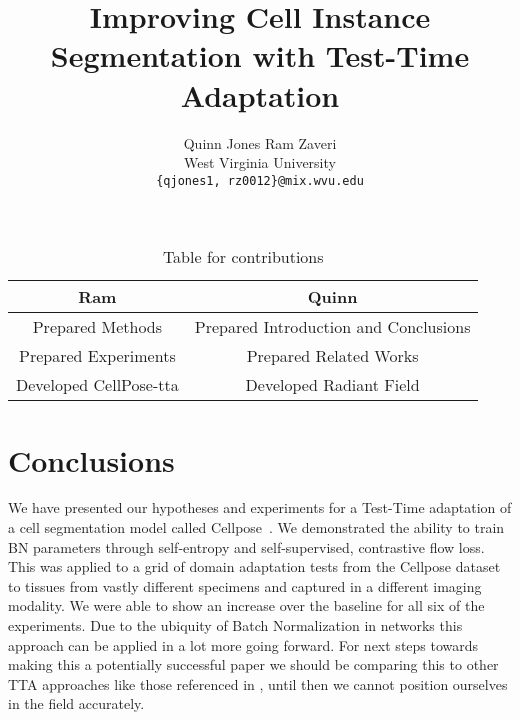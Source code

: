 \documentclass[10pt,twocolumn,letterpaper]{article}
\author{Quinn Jones \qquad Ram Zaveri \\
West Virginia University\\
{\tt\small \{qjones1, rz0012\}@mix.wvu.edu}
}
\begin{document}
\begin{table}[h]
\centering
\begin{tabular}{|c|c|}
\hline
\textbf{Ram} & \textbf{Quinn} \\ \hline
 Prepared Methods    & 
 Prepared Introduction and Conclusions
\\ \hline
Prepared Experiments & Prepared Related Works  \\
 \hline
Developed CellPose-tta & Developed Radiant Field  \\
\hline
\end{tabular}
\caption{Table for contributions}
\label{tab:ram_quinn}
\end{table}


\pagebreak\pagebreak
\title{Improving Cell Instance Segmentation with Test-Time Adaptation}
\maketitle
    





\section{Conclusions}
We have presented our hypotheses and experiments for a Test-Time adaptation of a cell segmentation model called Cellpose~\cite{stringer2021cellpose}. We demonstrated the ability to train BN parameters through self-entropy and self-supervised, contrastive flow loss.  This was applied to a grid of domain adaptation tests from the Cellpose dataset to tissues from vastly different specimens and captured in a different imaging modality. We were able to show an increase over the baseline for all six of the experiments.   Due to the ubiquity of Batch Normalization in networks this approach can be applied in a lot more going forward.  For next steps towards making this a potentially successful paper we should be comparing this to other TTA approaches like those referenced in , until then we cannot position ourselves in the field accurately. 


{
    \small
    
    
}

% 
\end{document}
